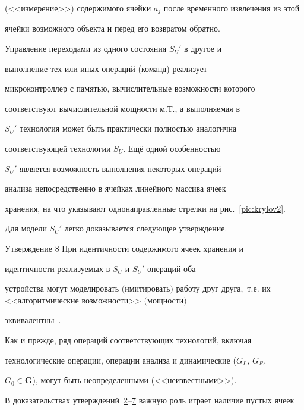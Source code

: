 (<<измерение>>) содержимого ячейки $a_{j}$ после временного извлечения из этой

ячейки возможного объекта и перед его возвратом обратно.



Управление переходами из одного состояния $S_{U}'$ в другое и

выполнение тех или иных операций (команд) реализует

микроконтроллер с памятью, вычислительные возможности которого

соответствуют вычислительной мощности м.Т., а выполняемая в

$S_{U}'$ технология может быть практически полностью аналогична

соответствующей технологии $S_{U}$. Ещё одной особенностью

$S_{U}'$ является возможность выполнения некоторых операций

анализа непосредственно в ячейках линейного массива ячеек

хранения, на что указывают однонаправленные стрелки на рис.~\ref{pic:krylov2}.



Для модели $S_{U}'$ легко доказывается следующее утверждение.



\smallskip



\begin{newthm}{Утверждение 8} При идентичности содержимого ячеек хранения и

идентичности реализуемых в $S_{U}$ и $S_{U}'$ операций оба

устройства могут моделировать $($имитировать$)$ работу друг друга$,$ т$.$е$.$ их <<алгоритмические возможности>> $($мощности$)$

эквивалентны~\rm\cite{krylov:bib3}.

\end{newthm}



\smallskip



Как и прежде, ряд операций соответствующих технологий, включая

технологические операции, операции анализа и динамические ($G_{L}$, $G_{R}$,

$G_{0 }\in \mathbf{G}$), могут быть неопределенными (<<неизвестными>>).



В доказательствах утверждений~\hyperlink{kr:utv2}{2}--\hyperlink{kr:utv7}{7} важную роль играет наличие пустых ячеек


